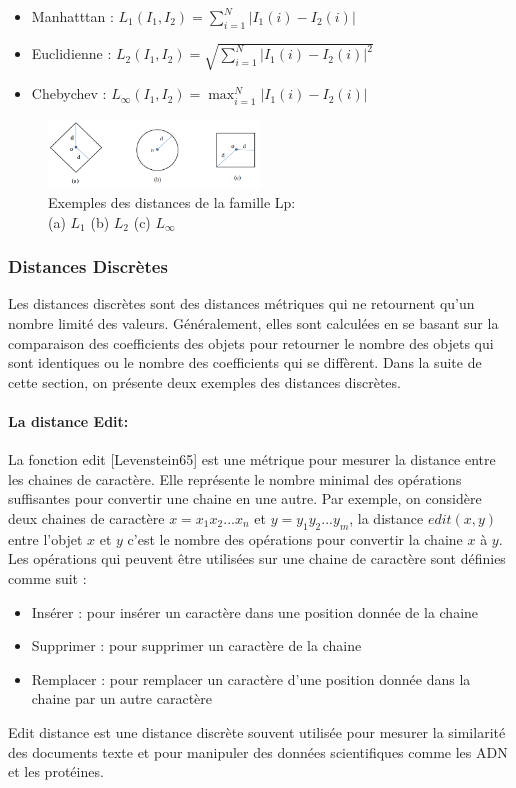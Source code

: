 \begin{itemize}
	\item Manhatttan :  $  L_1(I_1, I_2) = \sum_{i=1}^{N} \left|{I}_{1}(i)-{I}_{2}(i)\right|  $ 
	
	\item Euclidienne : $ L_2(I_1, I_2) =  \sqrt{\sum_{i=1}^{N} \left|{I}_{1}(i)-{I}_{2}(i)\right|^2} $
	
	\item Chebychev : 
	$L_{\infty}(I_1, I_2)=\max_{i=1}^N \left|{I}_{1}(i)-{I}_{2}(i)\right|$  
\end{itemize}

\begin{figure}[H]
	\centering
	\includegraphics[width=0.5\textwidth]{Figures/mink} %
	\caption{Exemples des distances de la famille Lp:\\ (a) $ L_1 $ (b) $ L_2 $ (c) 	$L_{\infty}$}
\end{figure}

\subsubsection{Distances Discrètes}
Les distances discrètes sont des distances métriques qui ne retournent qu’un nombre limité des valeurs. Généralement, elles sont calculées en se basant sur la comparaison des coefficients des objets pour retourner le nombre des objets qui sont identiques ou le nombre des coefficients qui se diffèrent. Dans la suite de cette section, on présente deux exemples des distances discrètes.

\paragraph{La distance Edit:}
La fonction edit [Levenstein65] est une métrique pour mesurer la distance entre les chaines de caractère. Elle représente le nombre minimal des opérations suffisantes pour convertir une chaine en une autre. Par exemple, on considère deux chaines de caractère $x=x_1x_2...x_n$ et $y=y_1y_2...y_m$, la distance $edit(x,y)$ entre l’objet $x$ et $y$ c’est le nombre des opérations pour convertir la chaine $x$ à $y$. Les opérations qui peuvent être utilisées sur une chaine de caractère sont définies comme suit :
\begin{itemize}
	\item Insérer : pour insérer un caractère dans une position donnée de la chaine
	\item Supprimer : pour supprimer un caractère de la chaine
	\item Remplacer : pour remplacer un caractère d’une position donnée dans la chaine par un autre caractère
\end{itemize}
Edit distance est une distance discrète souvent utilisée pour mesurer la similarité des documents texte et pour manipuler des données scientifiques comme les ADN et les protéines.

